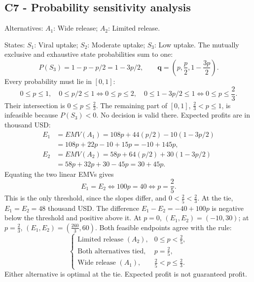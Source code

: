 \subsection*{C7 - Probability sensitivity analysis }
\label{sol:mobile-game-release-c7}
Alternatives: $A_1$: Wide release; $A_2$: Limited release.\par
States: $S_1$: Viral uptake; $S_2$: Moderate uptake; $S_3$: Low uptake.
The mutually exclusive and exhaustive state probabilities sum to one:
\[P(S_3)=1-p-p/2=1-3p/2,\qquad\boldsymbol{q}=\left(p,\frac p2,1-\frac{3p}{2}\right).\]
Every probability must lie in $[0,1]$:
\[0\le p\le1,\quad 0\le p/2\le1\iff0\le p\le2,\quad 0\le1-3p/2\le1\iff0\le p\le\frac23.\]
Their intersection is $\boxed{0\le p\le \frac{2}{3}}$.
The remaining part of $[0,1]$, $\frac{2}{3}<p\le1$, is infeasible because $P(S_3)<0$. No decision is valid there.
Expected profits are in thousand USD:
\begin{align*}
E_1&=EMV(A_1)=108p+44(p/2)-10(1-3p/2)\\&=108p+22p-10+15p=-10+145p,\\
E_2&=EMV(A_2)=58p+64(p/2)+30(1-3p/2)\\&=58p+32p+30-45p=30+45p.
\end{align*}
Equating the two linear EMVs gives
\[E_1=E_2\iff 100p=40\iff\boxed{p=\frac{2}{5}}.\]
This is the only threshold, since the slopes differ, and $0<\frac{2}{5}<\frac{2}{3}$. At the tie, $E_1=E_2=48$ thousand USD.
The difference $E_1-E_2=-40+100p$ is negative below the threshold and positive above it.
At $p=0$, $(E_1,E_2)=(-10,30)$; at $p=\frac{2}{3}$, $(E_1,E_2)=(\frac{260}{3},60)$.
Both feasible endpoints agree with the rule:
\[\boxed{\begin{cases}
\text{Limited release }(A_2),&0\le p<\frac{2}{5},\\
\text{Both alternatives tied},&p=\frac{2}{5},\\
\text{Wide release }(A_1),&\frac{2}{5}<p\le\frac{2}{3}.
\end{cases}}\]
Either alternative is optimal at the tie. Expected profit is not guaranteed profit.
\par\vspace{4mm}

